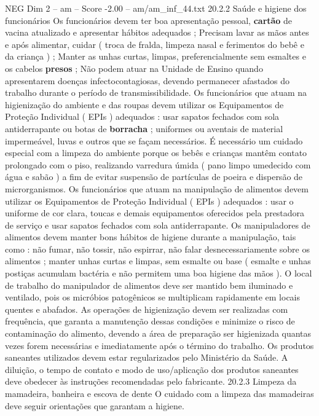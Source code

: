 \begin{textsample}{NEG Dim 2 – am – Score -2.00 – am/am\_inf\_44.txt}  \label{ex:f2_neg_134}
20.2.2 Saúde e higiene dos funcionários Os funcionários devem ter boa apresentação pessoal, \textbf{cartão} de vacina atualizado e apresentar hábitos adequados ; Precisam lavar as mãos antes e após alimentar, cuidar ( troca de fralda, limpeza nasal e ferimentos do bebê e da criança ) ; Manter as unhas curtas, limpas, preferencialmente sem esmaltes e os cabelos \textbf{presos} ; Não podem atuar na Unidade de Ensino quando apresentarem doenças infectocontagiosas, devendo permanecer afastados do trabalho durante o período de transmissibilidade.
Os funcionários que atuam na higienização do ambiente e das roupas devem utilizar os Equipamentos de Proteção Individual ( EPIs ) adequados : usar sapatos fechados com sola antiderrapante ou botas de \textbf{borracha} ; uniformes ou aventais de material impermeável, luvas e outros que se façam necessários.
É necessário um cuidado especial com a limpeza do ambiente porque os bebês e crianças mantêm contato prolongado com o piso, realizando varredura úmida ( pano limpo umedecido com água e sabão ) a fim de evitar suspensão de partículas de poeira e dispersão de microrganismos.
Os funcionários que atuam na manipulação de alimentos devem utilizar os Equipamentos de Proteção Individual ( EPIs ) adequados : usar o uniforme de cor clara, toucas e demais equipamentos oferecidos pela prestadora de serviço e usar sapatos fechados com sola antiderrapante.
Os manipuladores de alimentos devem manter bons hábitos de higiene durante a manipulação, tais como : não fumar, não tossir, não espirrar, não falar desnecessariamente sobre os alimentos ; manter unhas curtas e limpas, sem esmalte ou base ( esmalte e unhas postiças acumulam bactéria e não permitem uma boa higiene das mãos ).
O local de trabalho do manipulador de alimentos deve ser mantido bem iluminado e ventilado, pois os micróbios patogênicos se multiplicam rapidamente em locais quentes e abafados.
As operações de higienização devem ser realizadas com frequência, que garanta a manutenção dessas condições e minimize o risco de contaminação do alimento, devendo a área de preparação ser higienizada quantas vezes forem necessárias e imediatamente após o término do trabalho.
Os produtos saneantes utilizados devem estar regularizados pelo Ministério da Saúde.
A diluição, o tempo de contato e modo de uso/aplicação dos produtos saneantes deve obedecer às instruções recomendadas pelo fabricante. 20.2.3 Limpeza da mamadeira, banheira e escova de dente O cuidado com a limpeza das mamadeiras deve seguir orientações que garantam a higiene.

\end{textsample}
